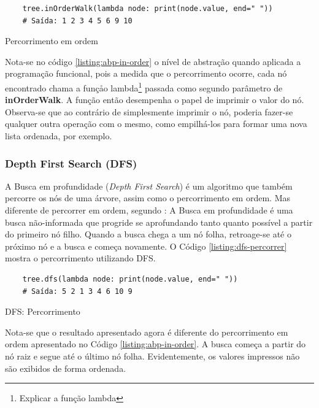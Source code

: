 \begin{listing}[H]
    \begin{verbatim}
    tree.inOrderWalk(lambda node: print(node.value, end=" "))
    # Saída: 1 2 3 4 5 6 9 10 
    \end{verbatim}
    \caption{Percorrimento em ordem}
    \label{listing:abp-in-order}
\end{listing}

Nota-se no código \ref{listing:abp-in-order} o nível de abstração quando aplicada a programação funcional, pois a medida que o percorrimento ocorre, cada nó encontrado chama a funçåo lambda\footnote{
    Explicar a função lambda
} passada como segundo parâmetro de \textbf{inOrderWalk}. A função então desempenha o papel de imprimir o valor do nó.
Observa-se que ao contrário de simplesmente imprimir o nó, poderia fazer-se qualquer outra operação com o mesmo, como empilhá-los para formar uma nova lista
ordenada, por exemplo.

\subsubsection{Depth First Search (DFS)}

A Busca em profundidade (\textit{Depth First Search}) é um algoritmo que também percorre os nós de uma árvore, assim como o percorrimento em ordem.
Mas diferente de percorrer em ordem, segundo \citeauthor{wiki_dfs}\cite{wiki_dfs}: A Busca em profundidade é uma busca não-informada que progride se
aprofundando tanto quanto possível a partir do primeiro nó filho. Quando a busca chega a um nó folha, retroage-se até o próximo nó e a busca e começa
novamente.
O Código \ref{listing:dfs-percorrer} mostra o percorrimento utilizando DFS.

\begin{listing}[H]
    \begin{verbatim}
    tree.dfs(lambda node: print(node.value, end=" "))
    # Saída: 5 2 1 3 4 6 10 9 
    \end{verbatim}
    \caption{DFS: Percorrimento}
    \label{listing:dfs-percorrer}
\end{listing}

Nota-se que o resultado apresentado agora é diferente do percorrimento em ordem apresentado no Código \ref{listing:abp-in-order}.
A busca começa a partir do nó raiz e segue até o último nó folha. Evidentemente, os valores impressos não são exibidos de forma ordenada.

